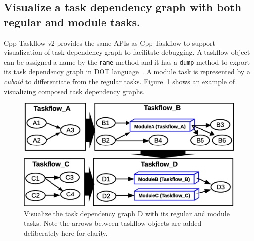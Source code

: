 \documentclass[conference]{IEEEtran}
\begin{document}
\subsection{Visualize a task dependency graph with both regular and module tasks.}
Cpp-Taskflow v2 provides the same APIs as Cpp-Taskflow to support visualization
of task dependency graph to facilitate debugging.
A taskflow object can be assigned a name by the \lstinline{name} method and it
has a \lstinline{dump} method to export its task dependency graph in DOT language~\cite{dot}.
A module task is represented by a \emph{cuboid} to differentiate from the regular tasks.
Figure~\ref{fig::framework_dump} shows an example of visualizing composed task dependency graphs.
% 
% 
% 
% 


\begin{figure}[!h]
  \centering
  \includegraphics[width=.9\columnwidth]{Fig/visualization.eps}
  \caption{
     Visualize the task dependency graph D with its regular and module tasks. 
     Note the arrows between taskflow objects are added deliberately here for clarity.
   }
  \label{fig::framework_dump}
\end{figure}
\end{document}
